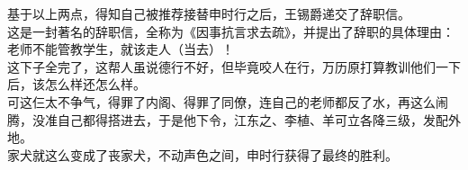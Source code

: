 \begin{multicols}{\theparacolNo}
基于以上两点，得知自己被推荐接替申时行之后，王锡爵递交了辞职信。\\

这是一封著名的辞职信，全称为《因事抗言求去疏》，并提出了辞职的具体理由：\\

老师不能管教学生，就该走人（当去）！\\

这下子全完了，这帮人虽说德行不好，但毕竟咬人在行，万历原打算教训他们一下后，该怎么样还怎么样。\\

可这仨太不争气，得罪了内阁、得罪了同僚，连自己的老师都反了水，再这么闹腾，没准自己都得搭进去，于是他下令，江东之、李植、羊可立各降三级，发配外地。\\

家犬就这么变成了丧家犬，不动声色之间，申时行获得了最终的胜利。\\
\ifnum{}
	\end{multicols}
\fi
\newpage
